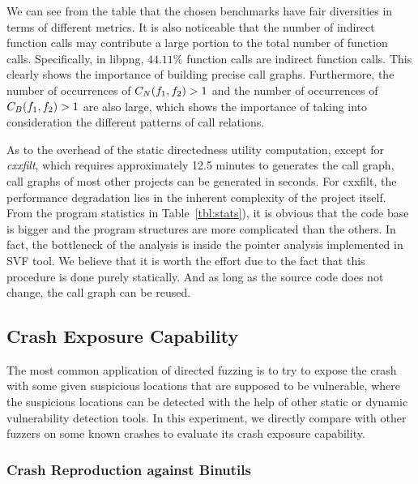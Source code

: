 We can see from  the table that the chosen benchmarks have fair diversities in terms of different metrics.
It is also noticeable that the number of indirect function calls may contribute a large portion to the total number of function calls.
Specifically, in libpng, $44.11\%$ function calls are indirect function calls.
This clearly shows the importance of building precise call graphs.
Furthermore, the number of occurrences of $C_N(f_1, f_2)>1$ and the number of occurrences of $C_B(f_1, f_2)>1$ are also large, which shows the importance of taking into consideration the different patterns of call relations.




As to the overhead of the static directedness utility computation, except for \emph{cxxfilt}, which requires approximately 12.5 minutes to generates the call graph, call graphs of most other projects can be generated in seconds. For cxxfilt, the performance degradation lies in the inherent complexity of the project itself. From the program statistics in Table~\ref{tbl:stats}), it is obvious that the code base is bigger and the program structures are more complicated than the others. In fact, the bottleneck of the analysis is inside the pointer analysis implemented in SVF tool. We believe that it is worth the effort due to the fact that this procedure is done purely statically. And as long as the source code does not change, the call graph can be reused.


\subsection{Crash Exposure Capability}\label{subsec:evalcrashrepro}

The most common application of directed fuzzing is to try to expose the crash with some given suspicious locations that are supposed to be vulnerable, where the suspicious locations can be detected with the help of other static or dynamic vulnerability detection tools.
In this experiment, we directly compare {\dFOT} with other fuzzers on some known crashes to evaluate its crash exposure capability.

\subsubsection{Crash Reproduction against Binutils}

